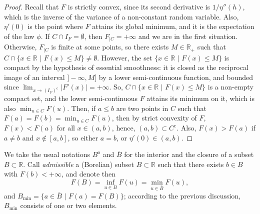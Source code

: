 \documentclass[12pt,a4paper,reqno]{amsart}
\theoremstyle{remark}
\newcommand{\R}{\mathbb{R}}
\begin{document}
\begin{proof}
Recall that $F$ is strictly convex, since its second derivative is $1/\eta''(h)$, which is the inverse of the variance of a non-constant random variable. Also, $\eta'(0)$ is the point where $F$ attains its global minimum, and it is the expectation of the law $\phi$. If $C \cap I_{F}=\emptyset$, then $F_{|C}=+\infty$ and we are in the first situation. Otherwise, $F_{|C}$ is finite at some points, so there exists $M \in \R_{+}$ such that $C \cap \{x \in \R \,\,|\,\,F(x) \leq M\} \neq \emptyset$. However, the set $ \{x \in \R \,\,|\,\,F(x) \leq M\}$ is compact by the hypothesis of essential smoothness: it is closed as the reciprocal image of an interval $]-\infty,M]$ by a lower semi-continuous function, and bounded since $\lim_{x \to (I_{F})^{\mathrm{c}}} |F'(x)|=+\infty$. So, $C \cap \{x \in \R \,\,|\,\,F(x) \leq M\}$ is a non-empty compact set, and the lower semi-continuous $F$ attains its minimum on it, which is also $\min_{u\in C}F(u)$. Then, if $a \leq b$ are two points in $C$ such that $F(a)=F(b)=\min_{u \in C}F(u)$, then by strict convexity of $F$, $F(x)<F(a)$ for all $x \in (a,b)$, hence, $(a,b) \subset C^{\mathrm{c}}$. Also, $F(x)>F(a)$ if $a \neq b$ and $x \notin [a,b]$, so either $a=b$, or $\eta'(0) \in (a,b)$.
\end{proof}\bigskip

We take the usual notations $B^{\mathrm{o}}$ and $\overline{B}$ for the interior and the closure of a subset $B \subset \R$. Call \emph{admissible} a (Borelian) subset $B \subset \R$ such that there exists $b \in B$ with
$F(b) < +\infty$, and denote then 
$$F(B)=\inf_{u \in B}F(u)=\min_{u \in \overline{B}}F(u),$$
and $B_{\min}= \{a \in \overline{B}\,\,|\,\,F(a)=F(B)\}$; according to the previous discussion, $B_{\min}$ consists of one or two elements.
\end{document}
